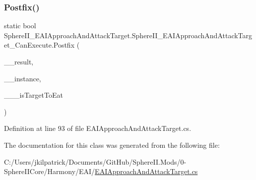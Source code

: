 \subsubsection{\texorpdfstring{Postfix()}{Postfix()}}
{\footnotesize\ttfamily static bool Sphere\+I\+I\+\_\+\+E\+A\+I\+Approach\+And\+Attack\+Target.\+Sphere\+I\+I\+\_\+\+E\+A\+I\+Approach\+And\+Attack\+Target\+\_\+\+Can\+Execute.\+Postfix (\begin{DoxyParamCaption}\item[{bool}]{\+\_\+\+\_\+result,  }\item[{E\+A\+I\+Approach\+And\+Attack\+Target}]{\+\_\+\+\_\+instance,  }\item[{ref bool}]{\+\_\+\+\_\+\+\_\+is\+Target\+To\+Eat }\end{DoxyParamCaption})\hspace{0.3cm}{\ttfamily [static]}}



Definition at line 93 of file E\+A\+I\+Approach\+And\+Attack\+Target.\+cs.



The documentation for this class was generated from the following file\+:\begin{DoxyCompactItemize}
\item 
C\+:/\+Users/jkilpatrick/\+Documents/\+Git\+Hub/\+Sphere\+I\+I.\+Mods/0-\/\+Sphere\+I\+I\+Core/\+Harmony/\+E\+A\+I/\mbox{\hyperlink{_e_a_i_approach_and_attack_target_8cs}{E\+A\+I\+Approach\+And\+Attack\+Target.\+cs}}\end{DoxyCompactItemize}
